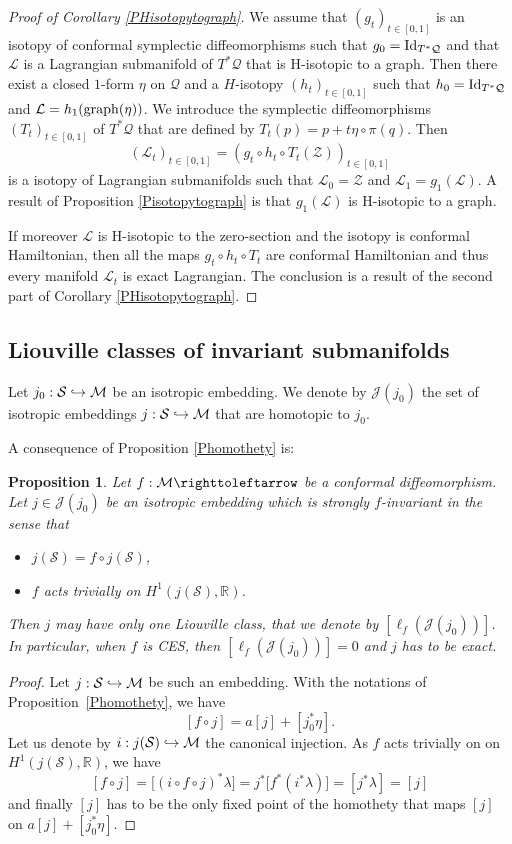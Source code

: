 \documentclass[10pt]{amsart}
\def\hto{\mathrel{\lhook\joinrel\to}}
\newtheorem{proposition}{Proposition}
\theoremstyle{definition}
\def\R{\mathbb{R}}
\def\cL{{\mathcal L}}
\def\cJ{{\mathcal J}}
\def\cM{{\mathcal M}}
\def\cQ{{\mathcal Q}}
\def\cS{{\mathcal S}}
\def\cZ{{\mathcal Z}}
\begin{document}
\begin{proof}[Proof of Corollary \ref{PHisotopytograph}]
We assume that $(g_t)_{t\in[0, 1]}$ is an isotopy of conformal symplectic diffeomorphisms such that $g_0={\rm Id}_{T^*\cQ}$ and that $\cL$ is a Lagrangian submanifold of $T^*\cQ$ that is H-isotopic to a graph. Then there exist a closed $1$-form $\eta$ on $\cQ$ and a $H$-isotopy $(h_t)_{t\in[0,1]}$ such that $h_0={\rm Id}_{T^*\cQ}$ and $\cL=h_1({\rm graph}(\eta))$. We introduce the symplectic diffeomorphisms $(T_t)_{t\in[0, 1]}$ of $T^*\cQ$ that are defined by $T_t(p)=p+t\eta\circ \pi(q)$. Then
\[
(\cL_t)_{t\in[0,1]}=(g_t\circ h_t\circ T_t(\cZ))_{t\in[0,1]}
\]
is a isotopy of Lagrangian submanifolds such that $\cL_0=\cZ$ and $\cL_1=g_1(\cL)$. A result of Proposition \ref{Pisotopytograph} is that $g_1(\cL)$ is H-isotopic to a graph.

If moreover $\cL$ is H-isotopic to the zero-section and the isotopy is conformal Hamiltonian, then all the maps $g_t\circ h_t\circ T_t$ are conformal Hamiltonian and thus every manifold $\cL_t$ is exact Lagrangian. The conclusion is a result of the second part of Corollary \ref{PHisotopytograph}.
\end{proof}

\subsection{Liouville classes of invariant submanifolds}

Let $ j_0:\cS\hto\cM$ be an isotropic embedding. We denote by $\cJ(j_0)$ the set of isotropic embeddings $ j:\cS\hto\cM$ that are homotopic to $j_0$.

A consequence of Proposition \ref{Phomothety} is:
\begin{proposition}\label{Puniqueclass}
Let $f: \cM \righttoleftarrow$ be a conformal diffeomorphism. Let $j\in\cJ(j_0)$ be an isotropic embedding which is strongly $f$-invariant in the sense that
\begin{itemize}
\item
$j(\cS)=f\circ j(\cS)$,
\item
$f$ acts trivially on $H^1(j(\cS),\R)$.
\end{itemize}
Then $j$ may have only one Liouville class, that we denote by $[\ell_f(\cJ(j_0))]$.
In particular, when $f$ is CES, then $[\ell_f(\cJ(j_0))]=0$ and $j$ has to be exact.
\end{proposition}

\begin{proof}
Let $ j:\cS\hto\cM$ be such an embedding. With the notations of Proposition~\ref{Phomothety}, we have
\[
[f\circ j]=a[j]+[j_0^*\eta].
\]
Let us denote by $i:j(\cS)\hto\cM$ the canonical injection. As $f$ acts trivially on on $H^1(j(\cS),\R)$, we have
\[
[f\circ j]=\big[(i\circ f\circ j)^*\lambda\big]=j^*\big[f^*(i^*\lambda)\big]=[j^*\lambda]=[j]
\]
and finally $[j]$ has to be the only fixed point of the homothety that maps $[j]$ on $a[j]+[j_0^*\eta]$.
\end{proof}
\end{document}
